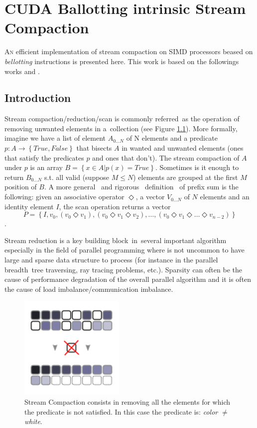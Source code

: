 \chapter{CUDA Ballotting intrinsic Stream Compaction}
\label{ch:stream_compaction}

\lettrine[lines=3,lhang=0.33,lraise=0,loversize=0.15]{A}{n} efficient implementation of stream compaction on SIMD processors beased on \textit{bellotting} instructions is presented here.
This work is based on the followings works \cite{Billetter} and \cite{Hughes}.
\section{Introduction}
Stream compaction/reduction/scan is commonly referred as the operation of removing unwanted elements in a collection (see Figure \ref{fig:stream_compaction}). More formally, imagine we have a list of element \(A_{0...N}\) of N elements and a predicate \(p : A \to\left \{ True,False\right \} \) that bisects \(A\) in wanted and unwanted elements (ones that satisfy the predicates \(p\) and ones that don't). The stream compaction of \(A\) under \(p\) is an array \(B=\left\{x \in A | p(x) = True\right\}\). Sometimes is it enough to return \(B_{0\ldots N}\) s.t. all valid (suppose \(M \leq N\)) elements are grouped at the first \(M\) position of \(B\). 
A more general  and rigorous  definition  of prefix sum  is the following: given an associative operator \(\Diamond\), a vector \(V_{0\ldots N}\) of \(N\) elements and an identity element \(I\), the scan operation returns a vector 
\[P=\left\{I,v_0,(v_0 \Diamond v_1),(v_0 \Diamond v_1 \Diamond v_2),\ldots,(v_0\Diamond v_1 \Diamond \ldots \Diamond v_{n-2})\right\}\].

Stream reduction is a key building block in several important algorithm especially in the field of parallel programming where is not uncommon to have large and sparse data structure to process (for instance in the parallel breadth tree traversing, ray tracing problems, etc.). Sparsity can often be the cause of performance degradation of the overall parallel algorithm and it is often the cause of load imbalance/communication imbalance.
\begin{figure}
	\begin{center}
		\includegraphics[width=5cm]{./images/stream_compaction/stream_compaction}
		\caption{Stream Compaction consists in removing all the elements for which the predicate is not satisfied. In this case the predicate is: \textit{color $\ne$ white}.}
		\label{fig:stream_compaction}
	\end{center}
\end{figure}

